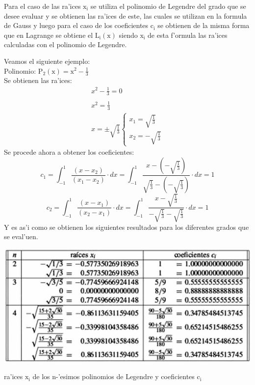 \documentclass[12pt]{article}
\begin{document}
					Para el caso de las ra'ices $\mathrm{x_{i}}$ se utiliza el polinomio de Legendre del grado que se desee evaluar y se obtienen las ra'ices de este, las cuales se utilizan en la formula de Gauss y luego para el caso de los coeficientes $\mathrm{c_{i}}$ se obtienen de la misma forma que en Lagrange se obtiene el $\mathrm{L_{i}(x)}$ siendo $\mathrm{x_{i}}$ de esta f'ormula las ra'ices calculadas con el polinomio de Legendre.
					
					Veamos el siguiente ejemplo:\\
					Polinomio:  $\mathrm{P_{2}(x)=x^{2}-\frac{1}{3}}$\\
					Se obtienen las ra'ices:
					\begin{equation}
						\begin{array}{lcc}
							x^{2}-\frac{1}{3}=0\\
							\\
							x^{2}=\frac{1}{3}\\
							x=\pm \sqrt{\frac{1}{3}}\left\{\begin{array}{lcc}
							x_{1}=\sqrt{\frac{1}{3}}\\
							x_{2}=-\sqrt{\frac{1}{3}}
							\end{array} 
							\right.
						\end{array}
					\end{equation}
					Se procede ahora a obtener los coeficientes:
					\begin{equation}
						c_{1}=\int_{-1}^{1}\frac{(x-x_{2})}{(x_{1}-x_{2})}\cdot dx=\int_{-1}^{1}\frac{x-(-\sqrt{\frac{1}{3}})}{\sqrt{\frac{1}{3}}-(-\sqrt{\frac{1}{3}})}\cdot dx=1
					\end{equation}
					\begin{equation}
					c_{2}=\int_{-1}^{1}\frac{(x-x_{1})}{(x_{2}-x_{1})}\cdot dx=\int_{-1}^{1}\frac{x-\sqrt{\frac{1}{3}}}{-\sqrt{\frac{1}{3}}-\sqrt{\frac{1}{3}}}\cdot dx=1
					\end{equation}
					Y es as'i como se obtienen los siguientes resultados para los diferentes grados que se eval'uen.
				\begin{center}
					\includegraphics[width=15cm]{roots}
					\par
					\vspace{0.2cm}
					ra'ices $\mathrm{x_{i}}$ de los n-'esimos polinomios de Legendre y coeficientes $\mathrm{c_{i}}$
				\end{center}
				
\end{document}

